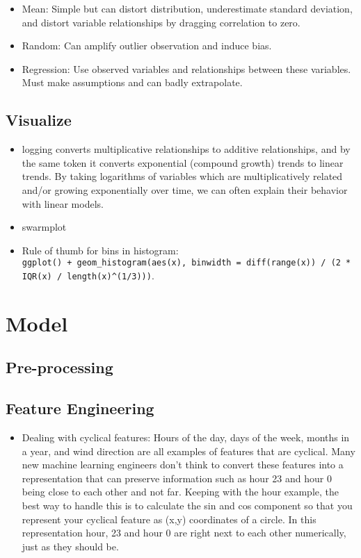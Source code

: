 \documentclass[]{book}
\providecommand{\tightlist}{%
  \setlength{\itemsep}{0pt}\setlength{\parskip}{0pt}}
\theoremstyle{definition}
\theoremstyle{definition}
\theoremstyle{definition}
\theoremstyle{remark}
\begin{document}
\begin{itemize}
\item
  Mean: Simple but can distort distribution, underestimate standard
  deviation, and distort variable relationships by dragging correlation
  to zero.
\item
  Random: Can amplify outlier observation and induce bias.
\item
  Regression: Use observed variables and relationships between these
  variables. Must make assumptions and can badly extrapolate.
\end{itemize}

\section{Visualize}\label{visualize}

\begin{itemize}
\item
  logging converts multiplicative relationships to additive
  relationships, and by the same token it converts exponential (compound
  growth) trends to linear trends. By taking logarithms of variables
  which are multiplicatively related and/or growing exponentially over
  time, we can often explain their behavior with linear models.
\item
  swarmplot
\item
  Rule of thumb for bins in histogram:
  \texttt{ggplot()\ +\ geom\_histogram(aes(x),\ binwidth\ =\ diff(range(x))\ /\ (2\ *\ IQR(x)\ /\ length(x)\^{}(1/3)))}.
\end{itemize}

\chapter{Model}\label{model}

\section{Pre-processing}\label{pre-processing}

\section{Feature Engineering}\label{feature-engineering}

\begin{itemize}
\tightlist
\item
  Dealing with cyclical features: Hours of the day, days of the week,
  months in a year, and wind direction are all examples of features that
  are cyclical. Many new machine learning engineers don't think to
  convert these features into a representation that can preserve
  information such as hour 23 and hour 0 being close to each other and
  not far. Keeping with the hour example, the best way to handle this is
  to calculate the sin and cos component so that you represent your
  cyclical feature as (x,y) coordinates of a circle. In this
  representation hour, 23 and hour 0 are right next to each other
  numerically, just as they should be.
\end{itemize}
\end{document}

